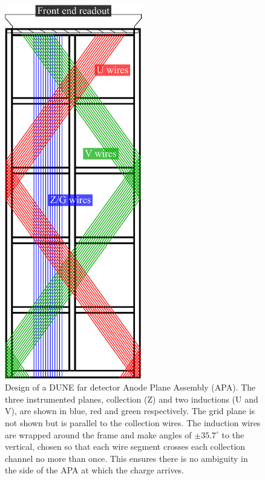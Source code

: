 \begin{figure}
  \centering
  \includegraphics[width=6cm]{FarDetectorAPA.eps}
  \caption[Design of a DUNE far detector Anode Plane Assembly (APA).]{Design of a DUNE far detector Anode Plane Assembly (APA).  The three instrumented planes, collection (Z) and two inductions (U and V), are shown in blue, red and green respectively.  The grid plane is not shown but is parallel to the collection wires.  The induction wires are wrapped around the frame and make angles of $\pm35.7^{\circ}$ to the vertical, chosen so that each wire segment crosses each collection channel no more than once.  This ensures there is no ambiguity in the side of the APA at which the charge arrives.}
  \label{fig:DUNEFarDetectorAPA}
\end{figure}

